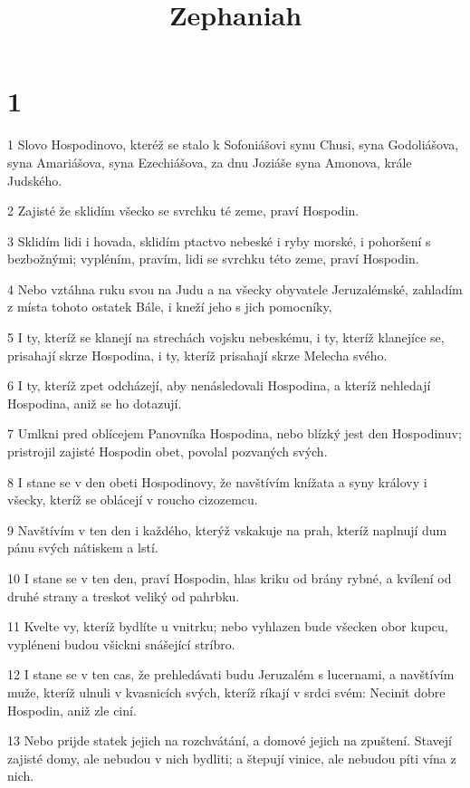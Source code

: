 

\title{Zephaniah}

\chapter{1}

\par 1 Slovo Hospodinovo, kteréž se stalo k Sofoniášovi synu Chusi, syna Godoliášova, syna Amariášova, syna Ezechiášova, za dnu Joziáše syna Amonova, krále Judského.
\par 2 Zajisté že sklidím všecko se svrchku té zeme, praví Hospodin.
\par 3 Sklidím lidi i hovada, sklidím ptactvo nebeské i ryby morské, i pohoršení s bezbožnými; vypléním, pravím, lidi se svrchku této zeme, praví Hospodin.
\par 4 Nebo vztáhna ruku svou na Judu a na všecky obyvatele Jeruzalémské, zahladím z místa tohoto ostatek Bále, i kneží jeho s jich pomocníky,
\par 5 I ty, kteríž se klanejí na strechách vojsku nebeskému, i ty, kteríž klanejíce se, prisahají skrze Hospodina, i ty, kteríž prisahají skrze Melecha svého.
\par 6 I ty, kteríž zpet odcházejí, aby nenásledovali Hospodina, a kteríž nehledají Hospodina, aniž se ho dotazují.
\par 7 Umlkni pred oblícejem Panovníka Hospodina, nebo blízký jest den Hospodinuv; pristrojil zajisté Hospodin obet, povolal pozvaných svých.
\par 8 I stane se v den obeti Hospodinovy, že navštívím knížata a syny královy i všecky, kteríž se oblácejí v roucho cizozemcu.
\par 9 Navštívím v ten den i každého, kterýž vskakuje na prah, kteríž naplnují dum pánu svých nátiskem a lstí.
\par 10 I stane se v ten den, praví Hospodin, hlas kriku od brány rybné, a kvílení od druhé strany a treskot veliký od pahrbku.
\par 11 Kvelte vy, kteríž bydlíte u vnitrku; nebo vyhlazen bude všecken obor kupcu, vypléneni budou všickni snášející stríbro.
\par 12 I stane se v ten cas, že prehledávati budu Jeruzalém s lucernami, a navštívím muže, kteríž ulnuli v kvasnicích svých, kteríž ríkají v srdci svém: Necinit dobre Hospodin, aniž zle ciní.
\par 13 Nebo prijde statek jejich na rozchvátání, a domové jejich na zpuštení. Stavejí zajisté domy, ale nebudou v nich bydliti; a štepují vinice, ale nebudou píti vína z nich.
